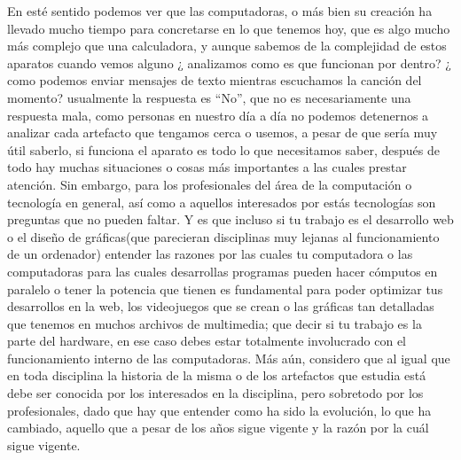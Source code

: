 \documentclass[letterpaper,12pt,oneside]{book}
\begin{document}
	En esté sentido podemos ver que las computadoras, o más bien su creación ha llevado mucho tiempo para concretarse en lo que tenemos hoy, que es algo mucho
	más complejo que una calculadora, y aunque sabemos de la complejidad de estos aparatos cuando vemos alguno ¿ analizamos como es que funcionan por dentro? ¿ como podemos enviar mensajes de texto mientras escuchamos la canción del momento?
	usualmente la respuesta es ``No'', que no es necesariamente una respuesta mala, como personas en nuestro día a día no podemos detenernos a analizar cada artefacto que tengamos cerca o usemos, a pesar de que sería muy útil saberlo,
	si funciona el aparato es todo lo que necesitamos saber, después de todo hay muchas situaciones o cosas más importantes
	a las cuales prestar atención. Sin embargo, para los profesionales del área de la computación o tecnología en general, así como a aquellos interesados
	por estás tecnologías son preguntas que no pueden faltar. Y es que incluso si tu trabajo es el desarrollo web o
	el diseño de gráficas(que parecieran disciplinas muy lejanas al funcionamiento de un ordenador) entender las razones por las cuales tu computadora o las computadoras para las cuales desarrollas programas pueden hacer cómputos
	en paralelo o tener la potencia que tienen es fundamental para poder optimizar tus desarrollos en la web, los videojuegos que se crean o las gráficas tan detalladas que tenemos en muchos archivos de multimedia; que decir si tu trabajo es la parte del hardware, en ese
	caso debes estar totalmente involucrado con el funcionamiento interno de las computadoras.
	Más aún, considero que al igual que en toda disciplina la historia de la misma o de los artefactos que estudia está debe ser conocida por
	los interesados en la disciplina, pero sobretodo por los profesionales, dado que hay que entender como ha sido la evolución, lo que ha cambiado,
	aquello que a pesar de los años sigue vigente y la razón por la cuál sigue vigente.
	
\end{document}
